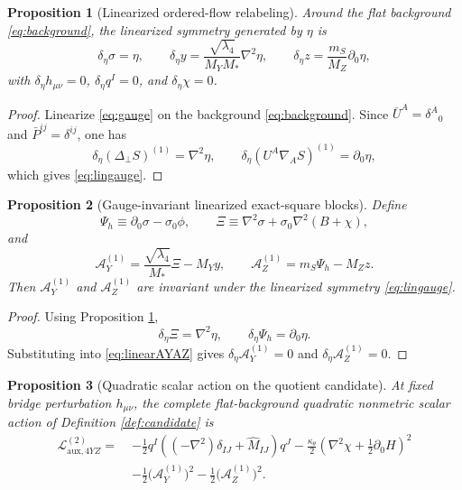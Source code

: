 \documentclass[11pt]{article}
\newcommand{\AY}{\mathcal A_Y}
\newcommand{\AZ}{\mathcal A_Z}
\newtheorem{proposition}{Proposition}
\begin{document}
\begin{proposition}[Linearized ordered-flow relabeling]
\label{prop:linGauge}
Around the flat background \eqref{eq:background}, the linearized symmetry generated by \(\eta\) is
\begin{equation}
\delta_\eta \sigma=\eta,
\qquad
\delta_\eta y=\frac{\sqrt{\lambda_4}}{M_YM_*}\nabla^2\eta,
\qquad
\delta_\eta z=\frac{m_S}{M_Z}\partial_0\eta,
\label{eq:lingauge}
\end{equation}
with \(\delta_\eta h_{\mu\nu}=0\), \(\delta_\eta q^I=0\), and \(\delta_\eta\chi=0\).
\end{proposition}

\begin{proof}
Linearize \eqref{eq:gauge} on the background \eqref{eq:background}. Since \(\bar U^A=\delta^A{}_0\) and \(\bar P^{ij}=\delta^{ij}\), one has
\[
\delta_\eta\!\left(\Delta_\perp S\right)^{(1)}=\nabla^2\eta,
\qquad
\delta_\eta\!\left(U^A\nabla_A S\right)^{(1)}=\partial_0\eta,
\]
which gives \eqref{eq:lingauge}.
\end{proof}

\begin{proposition}[Gauge-invariant linearized exact-square blocks]
\label{prop:lininv}
Define
\begin{equation}
\Psi_h\equiv \partial_0\sigma-\sigma_0\phi,
\qquad
\Xi\equiv \nabla^2\sigma+\sigma_0\nabla^2(B+\chi),
\label{eq:psixi}
\end{equation}
and
\begin{equation}
\AY^{(1)}
=
\frac{\sqrt{\lambda_4}}{M_*}\Xi-M_Yy,
\qquad
\AZ^{(1)}
=
m_S\Psi_h-M_Zz.
\label{eq:linearAYAZ}
\end{equation}
Then \(\AY^{(1)}\) and \(\AZ^{(1)}\) are invariant under the linearized symmetry \eqref{eq:lingauge}.
\end{proposition}

\begin{proof}
Using Proposition \ref{prop:linGauge},
\[
\delta_\eta \Xi=\nabla^2\eta,
\qquad
\delta_\eta \Psi_h=\partial_0\eta.
\]
Substituting into \eqref{eq:linearAYAZ} gives \(\delta_\eta\AY^{(1)}=0\) and \(\delta_\eta\AZ^{(1)}=0\).
\end{proof}

\begin{proposition}[Quadratic scalar action on the quotient candidate]
\label{prop:quad}
At fixed bridge perturbation \(h_{\mu\nu}\), the complete flat-background quadratic nonmetric scalar action of Definition \ref{def:candidate} is
\begin{align}
\mathcal L_{\mathrm{aux},4YZ}^{(2)}
=\;&
-\frac12 q^I\!\left((-\nabla^2)\delta_{IJ}+\widehat M_{IJ}\right)\!q^J
-\frac{\kappa_\theta}{2}
\left(
\nabla^2\chi+\frac12\partial_0H
\right)^2
\nonumber\\
&-\frac12\bigl(\AY^{(1)}\bigr)^2
-\frac12\bigl(\AZ^{(1)}\bigr)^2.
\label{eq:quad}
\end{align}
\end{proposition}
\end{document}
